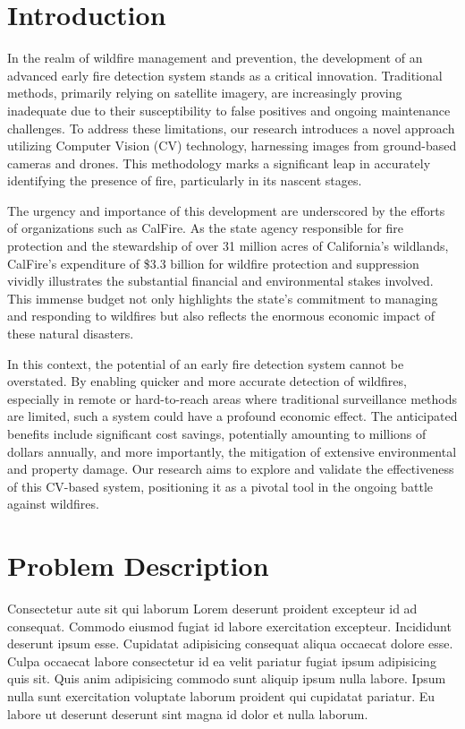 \section{Introduction}

In the realm of wildfire management and prevention, the development of an advanced early fire detection system stands as a critical innovation. Traditional methods, primarily relying on satellite imagery, are increasingly proving inadequate due to their susceptibility to false positives and ongoing maintenance challenges. To address these limitations, our research introduces a novel approach utilizing Computer Vision (CV) technology, harnessing images from ground-based cameras and drones. This methodology marks a significant leap in accurately identifying the presence of fire, particularly in its nascent stages.

The urgency and importance of this development are underscored by the efforts of organizations such as CalFire. As the state agency responsible for fire protection and the stewardship of over 31 million acres of California's wildlands, CalFire's expenditure of \$3.3 billion for wildfire protection and suppression vividly illustrates the substantial financial and environmental stakes involved. ~\citep{calfire} This immense budget not only highlights the state's commitment to managing and responding to wildfires but also reflects the enormous economic impact of these natural disasters.

In this context, the potential of an early fire detection system cannot be overstated. By enabling quicker and more accurate detection of wildfires, especially in remote or hard-to-reach areas where traditional surveillance methods are limited, such a system could have a profound economic effect. The anticipated benefits include significant cost savings, potentially amounting to millions of dollars annually, and more importantly, the mitigation of extensive environmental and property damage. Our research aims to explore and validate the effectiveness of this CV-based system, positioning it as a pivotal tool in the ongoing battle against wildfires.

\section{Problem Description}

Consectetur aute sit qui laborum Lorem deserunt proident excepteur id ad consequat. Commodo eiusmod fugiat id labore exercitation excepteur. Incididunt deserunt ipsum esse. Cupidatat adipisicing consequat aliqua occaecat dolore esse. Culpa occaecat labore consectetur id ea velit pariatur fugiat ipsum adipisicing quis sit. Quis anim adipisicing commodo sunt aliquip ipsum nulla labore. Ipsum nulla sunt exercitation voluptate laborum proident qui cupidatat pariatur. Eu labore ut deserunt deserunt sint magna id dolor et nulla laborum.

